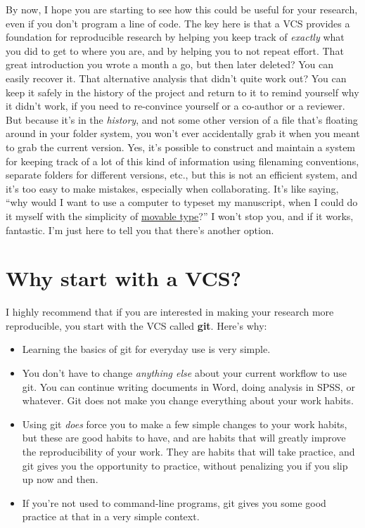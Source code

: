 \documentclass{article}
\begin{document}
By now, I hope you are starting to see how this could be useful for your research, even if you don't program a line of code. The key here is that a VCS provides a foundation for reproducible research by helping you keep track of \emph{exactly} what you did to get to where you are, and by helping you to not repeat effort. That great introduction you wrote a month a go, but then later deleted?  You can easily recover it.  That alternative analysis that didn't quite work out?  You can keep it safely in the history of the project and return to it to remind yourself why it didn't work, if you need to re-convince yourself or a co-author or a reviewer. But because it's in the \emph{history}, and not some other version of a file that's floating around in your folder system, you won't ever accidentally grab it when you meant to grab the current version. Yes, it's possible to construct and maintain a system for keeping track of a lot of this kind of information using filenaming conventions, separate folders for different versions, etc., but this is not an efficient system, and it's too easy to make mistakes, especially when collaborating.  It's like saying, ``why would I want to use a computer to typeset my manuscript, when I could do it myself with the simplicity of \href{http://en.wikipedia.org/wiki/Movable_type}{movable type}?''  I won't stop you, and if it works, fantastic. I'm just here to tell you that there's another option.
\section{Why start with a VCS?}
\label{sec-3}

I highly recommend that if you are interested in making your research more reproducible, you start with the VCS called \textbf{git}. Here's why:

\begin{itemize}
\item Learning the basics of git for everyday use is very simple.
\item You don't have to change \emph{anything else} about your current workflow to use git. You can continue writing documents in Word, doing analysis in SPSS, or whatever.  Git does not make you change everything about your work habits.
\item Using git \emph{does} force you to make a few simple changes to your work habits, but these are good habits to have, and are habits that will greatly improve the reproducibility of your work. They are habits that will take practice, and git gives you the opportunity to practice, without penalizing you if you slip up now and then.
\item If you're not used to command-line programs, git gives you some good practice at that in a very simple context.
\end{itemize}
\end{document}
